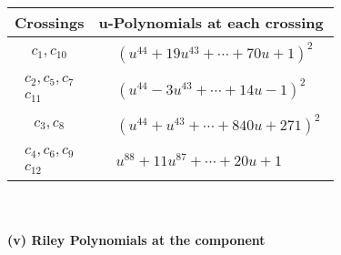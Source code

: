 \documentclass[1p]{elsarticle_modified}
\theoremstyle{definition}
\begin{document}
\begin{tabular}{m{50pt}|m{274pt}}
Crossings & \hspace{64pt}u-Polynomials at each crossing \\
\hline $$\begin{aligned}c_{1},c_{10}\end{aligned}$$&$\begin{aligned}
&(u^{44}+19 u^{43}+\cdots+70 u+1)^{2}
\end{aligned}$\\
\hline $$\begin{aligned}c_{2},c_{5},c_{7}\\c_{11}\end{aligned}$$&$\begin{aligned}
&(u^{44}-3 u^{43}+\cdots+14 u-1)^{2}
\end{aligned}$\\
\hline $$\begin{aligned}c_{3},c_{8}\end{aligned}$$&$\begin{aligned}
&(u^{44}+u^{43}+\cdots+840 u+271)^{2}
\end{aligned}$\\
\hline $$\begin{aligned}c_{4},c_{6},c_{9}\\c_{12}\end{aligned}$$&$\begin{aligned}
&u^{88}+11 u^{87}+\cdots+20 u+1
\end{aligned}$\\
\hline
\end{tabular}\\~\\
\newpage\renewcommand{\arraystretch}{1}
\flushleft \textbf{(v) Riley Polynomials at the component}\newline \\
\end{document}
